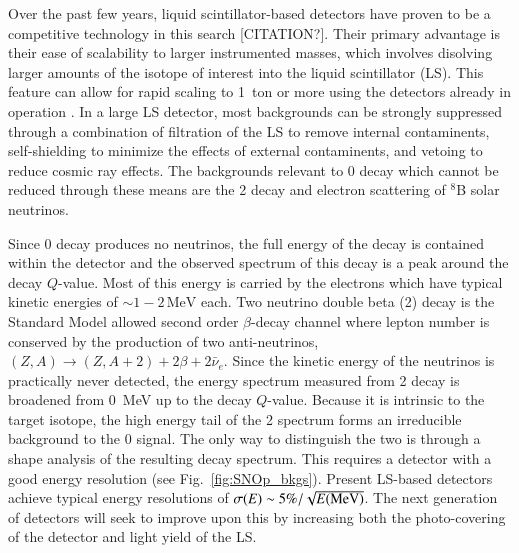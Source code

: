 Over the past few years, liquid scintillator-based detectors have
proven to be a competitive technology in this search
[CITATION?]. Their primary advantage is their ease of scalability to
larger instrumented masses, which involves disolving larger amounts of
the isotope of interest into the liquid scintillator (LS). This
feature can allow for rapid scaling to 1~ton or more using the
detectors already in operation \cite{Biller2013}. In a large LS
detector, most backgrounds can be strongly suppressed through a
combination of filtration of the LS to remove internal contaminents,
self-shielding to minimize the effects of external contaminents, and
vetoing to reduce cosmic ray effects. The backgrounds relevant to
0{\nbb} decay which cannot be reduced through these means are the
2{\nbb} decay and electron scattering of $^8$B solar neutrinos.

Since 0{\nbb} decay produces no neutrinos, the full energy of the
decay is contained within the detector and the observed spectrum of
this decay is a peak around the decay $Q$-value. Most of this energy
is carried by the electrons which have typical kinetic energies of
$\sim1-2\,\mathrm{MeV}$ each. Two neutrino double beta (2{\nbb}) decay
\cite{GoeppertMayer1935} is the Standard Model allowed second order
$\beta$-decay channel where lepton number is conserved by the
production of two anti-neutrinos,
\mbox{$(Z,A)\rightarrow(Z,A+2)+2\beta+2\bar\nu_e$}. Since the kinetic
energy of the neutrinos is practically never detected, the energy
spectrum measured from 2{\nbb} decay is broadened from 0~MeV up to the
decay $Q$-value. Because it is intrinsic to the target isotope, the
high energy tail of the 2{\nbb} spectrum forms an irreducible
background to the 0{\nbb} signal. The only way to distinguish the two
is through a shape analysis of the resulting decay spectrum. This
requires a detector with a good energy resolution (see
Fig.~\ref{fig:SNOp_bkgs}). Present LS-based detectors achieve typical
energy resolutions of \mbox{$\sigma(E)\sim 5\%/\sqrt{E(\rm
    MeV)}$}. The next generation of detectors will seek to improve
upon this by increasing both the photo-covering of the detector and
light yield of the LS. 
  
